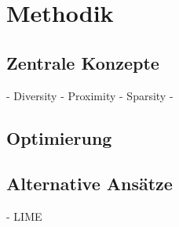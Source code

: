 \chapter{Methodik}

\section{Zentrale Konzepte}
- Diversity
- Proximity
- Sparsity
- 

\section{Optimierung}

\section{Alternative Ansätze}
- LIME